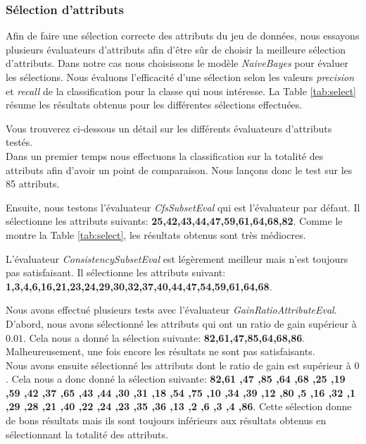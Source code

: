 \documentclass[11pt,a4paper]{article}
\begin{document}
			\subsubsection*{Sélection d'attributs}
			
				Afin de faire une sélection correcte des attributs du jeu de données, nous essayons plusieurs évaluateurs d'attributs afin d'être sûr de choisir la meilleure sélection d'attributs. Dans notre cas nous choisissons le modèle \textit{NaiveBayes} pour évaluer les sélections. Nous évaluons l'efficacité d'une sélection selon les valeurs \textit{precision} et \textit{recall} de la classification pour la classe qui nous intéresse. La Table \ref{tab:select} résume les résultats obtenus pour les différentes sélections effectuées.
				
				Vous trouverez ci-dessous un détail sur les différents évaluateurs d'attributs testés. 
				\\
				
				Dans un premier temps nous effectuons la classification sur la totalité des attributs afin d'avoir un point de comparaison. Nous lançons donc le test sur les 85 attributs.
				
				Ensuite, nous testons l'évaluateur \textit{CfsSubsetEval} qui est l'évaluateur par défaut. Il sélectionne les attributs suivants: \textbf{25,42,43,44,47,59,61,64,68,82}. Comme le montre la Table \ref{tab:select}, les résultats obtenus sont très médiocres.
				
				L'évaluateur \textit{ConsistencySubsetEval} est légèrement meilleur mais n'est toujours pas satisfaisant. Il sélectionne les attributs suivant: \textbf{1,3,4,6,16,21,23,24,29,30,32,37,40,44,47,54,59,61,64,68}.
				
				Nous avons effectué plusieurs tests avec l'évaluateur \textit{GainRatioAttributeEval}. D'abord, nous avons sélectionné les attributs qui ont un ratio de gain supérieur à $0.01$. Cela nous a donné la sélection suivante: \textbf{82,61,47,85,64,68,86}. Malheureusement, une fois encore les résultats ne sont pas satisfaisants.\\
				Nous avons ensuite sélectionné les attributs dont le ratio de gain est supérieur à $0$. Cela nous a donc donné la sélection suivante: \textbf{82,61 ,47 ,85 ,64 ,68 ,25 ,19 ,59 ,42 ,37 ,65 ,43 ,44 ,30 ,31 ,18 ,54 ,75 ,10 ,34 ,39 ,12 ,80 ,5 ,16 ,32 ,1 ,29 ,28 ,21 ,40 ,22 ,24 ,23 ,35 ,36 ,13 ,2 ,6 ,3 ,4 ,86}. Cette sélection donne de bons résultats mais ils sont toujours inférieurs aux résultats obtenus en sélectionnant la totalité des attributs.
				
\end{document}
